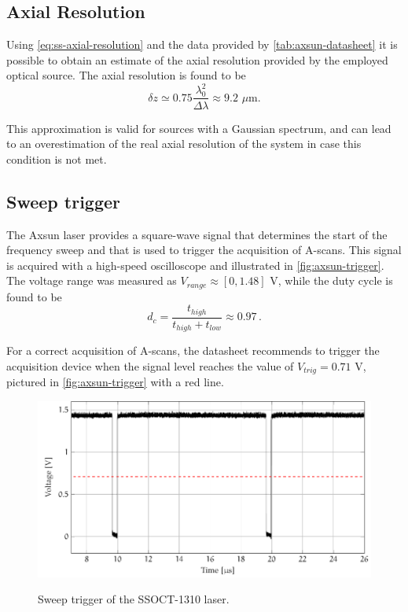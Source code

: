 \subsection{Axial Resolution}
Using \autoref{eq:ss-axial-resolution} and the data provided by \autoref{tab:axsun-datasheet} it is possible to obtain an estimate of the axial resolution provided by the employed optical source. The axial resolution is found to be
\begin{equation}
\delta z \simeq 0.75 \frac{\lambda_0^2}{\Delta \lambda} \approx 9.2 \,\, \mu\text{m.}
\end{equation}

This approximation is valid for sources with a Gaussian spectrum, and can lead to an overestimation of the real axial resolution of the system in case this condition is not met. 

\subsection{Sweep trigger}
The Axsun laser provides a square-wave signal that determines the start of the frequency sweep  and that is used to trigger the acquisition of A-scans. This signal is acquired with a high-speed oscilloscope and illustrated in \autoref{fig:axsun-trigger}. The voltage range was measured as $V_{range} \approx [0 ,1.48] $ V, while the duty cycle is found to be 
\begin{equation}
	d_c = \frac{t_{high}}{t_{high} + t_{low}} \approx 0.97\,.
\end{equation}

For a correct acquisition of A-scans, the datasheet recommends to trigger the acquisition device when the signal level reaches the value of $V_{trig} = 0.71$ V, pictured in \autoref{fig:axsun-trigger} with a red line. 


\begin{figure}[hbt]
	\myfloatalign
	{\includegraphics[width=0.8\linewidth]{gfx/ch3/trigger}}\\
	\caption{Sweep trigger of the SSOCT-1310 laser.}\label{fig:axsun-trigger}
\end{figure}

